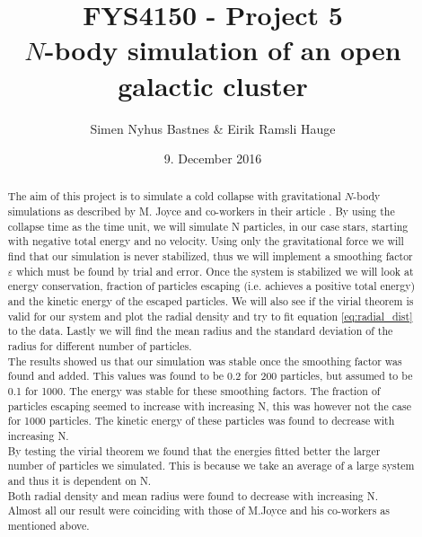 \documentclass{article}
\title{FYS4150 - Project 5\\$N$-body simulation of an open galactic cluster}
\author{Simen Nyhus Bastnes \& Eirik Ramsli Hauge}
\date{9. December 2016}
\begin{document}
\maketitle
\begin{abstract}
The aim of this project is to simulate a cold collapse with gravitational $N$-body simulations as described by M. Joyce and co-workers in their article \cite{Joyce}. By using the collapse time as the time unit, we will simulate N particles, in our case stars, starting with negative total energy and no velocity. Using only the gravitational force we will find that our simulation is never stabilized, thus we will implement a smoothing factor $\varepsilon$ which must be found by trial and error. Once the system is stabilized we will look at energy conservation, fraction of particles escaping (i.e. achieves a positive total energy) and the kinetic energy of the escaped particles. We will also see if the virial theorem is valid for our system and plot the radial density and try to fit equation \eqref{eq:radial_dist} to the data. Lastly we will find the mean radius and the standard deviation of the radius for different number of particles. \\
The results showed us that our simulation was stable once the smoothing factor was found and added. This values was found to be 0.2 for 200 particles, but assumed to be 0.1 for 1000. The energy was stable for these smoothing factors. The fraction of particles escaping seemed to increase with increasing N, this was however not the case for 1000 particles. The kinetic energy of these particles was found to decrease with increasing N. \\ 
By testing the virial theorem we found that the energies fitted better the larger number of particles we simulated. This is because we take an average of a large system and thus it is dependent on N. \\
Both radial density and mean radius were found to decrease with increasing N. \\
Almost all our result were coinciding with those of M.Joyce and his co-workers as mentioned above.
\end{abstract}
\end{document}
